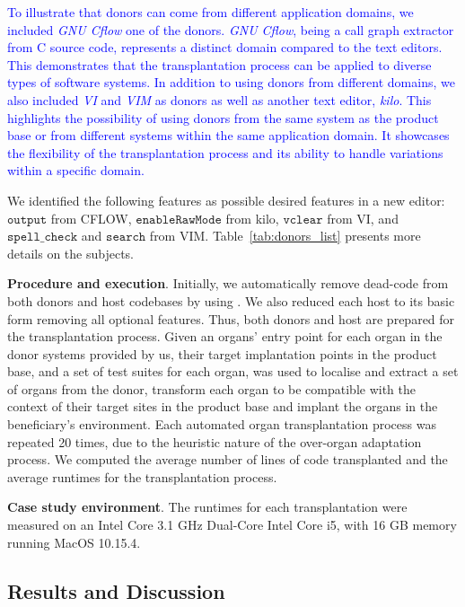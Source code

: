 \textcolor{blue}{To illustrate that donors can come from different application domains, we included \textit{GNU Cflow} one of the donors. \textit{GNU Cflow}, being a call graph extractor from C source code, represents a distinct domain compared to the text editors. This demonstrates that the transplantation process can be applied to diverse types of software systems. In addition to using donors from different domains, we also included \textit{VI} and \textit{VIM} as donors as well as another text editor, \emph{kilo}. This highlights the possibility of using donors from the same system as the product base or from different systems within the same application domain. It showcases the flexibility of the transplantation process and its ability to handle variations within a specific domain.}

We identified the following features as possible desired features in a new editor: $\texttt{output}$ from CFLOW, $\texttt{enableRawMode}$ from kilo, $\texttt{vclear}$ from VI, and $\texttt{spell\_check}$ and $\texttt{search}$ from VIM. Table~\ref{tab:donors_list} presents more details on the subjects.

\textbf{Procedure and execution}. 
Initially, we automatically remove dead-code from both donors and host codebases by using \prodscalpel. 
We also reduced each host to its basic form removing all optional features. Thus, both donors and host are prepared for the transplantation process. 
Given an organs' entry point for each organ in the donor systems provided by us, their target implantation points in the product base, and a set of test suites for each organ, \prodscalpel was used to localise and extract a set of organs from the donor, transform each organ to be compatible with the context of their target sites in the product base and implant the organs in the beneficiary's environment. Each automated organ transplantation process was repeated 20 times, due to the heuristic nature of the over-organ adaptation process. We computed the average number of lines of code transplanted and the average runtimes for the transplantation process.

\textbf{Case study environment}. The runtimes for each transplantation were measured on an Intel Core 3.1 GHz Dual-Core Intel Core i5, with 16 GB memory running MacOS 10.15.4.



\subsection{Results and Discussion} \label{sec:result_discussion}



